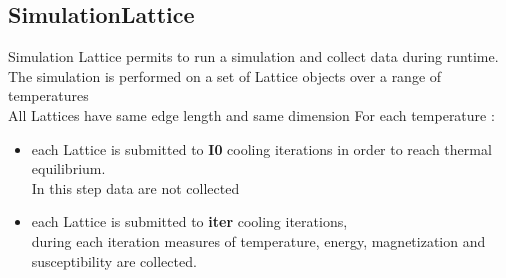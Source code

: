 \subsection*{SimulationLattice}

Simulation Lattice permits to run a simulation and collect data during runtime.
The simulation is performed on a set of Lattice objects over a range of temperatures \\
All Lattices have same edge length and same dimension
For each temperature :  
\begin{itemize}
	\item[] each Lattice is submitted to \textbf{I0} cooling iterations in order to reach thermal equilibrium. \\ In this step data are not collected
	\item[] each Lattice is submitted to \textbf{iter} cooling iterations,   \\
	 		during each iteration measures of temperature, energy, magnetization and susceptibility are 				collected. 
\end{itemize} 
 
